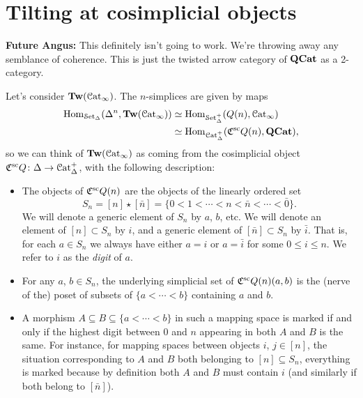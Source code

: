 \documentclass[main.tex]{subfiles}
\begin{document}
\section{Tilting at cosimplicial objects}
\label{sec:tilting_at_cosimplicial_objects}

\textbf{Future Angus:} This definitely isn't going to work. We're throwing away any semblance of coherence. This is just the twisted arrow category of $\mathbf{QCat}$ as a 2-category.

Let's consider $\mathbf{Tw}(\mathcal{C}\mathrm{at}_{\infty})$. The $n$-simplices are given by maps
\begin{align*}
  \mathrm{Hom}_{\mathcal{S}\mathrm{et}_{\Delta}}(\Delta^{n}, \mathbf{Tw}(\mathcal{C}\mathrm{at}_{\infty})) &\simeq \mathrm{Hom}_{\mathcal{S}\mathrm{et}_{\Delta}^{+}}(Q(n), \mathcal{C}\mathrm{at}_{\infty}) \\
  &\simeq \mathrm{Hom}_{\mathcal{C}\mathrm{at}_{\Delta}^{+}}(\mathfrak{C}^{\mathrm{sc}} Q(n), \mathbf{QCat}),
\end{align*}
so we can think of $\mathbf{Tw}(\mathcal{C}\mathrm{at}_{\infty})$ as coming from the cosimplicial object $\mathfrak{C}^{\mathrm{sc}} Q\colon \Delta \to \mathcal{C}\mathrm{at}_{\Delta}^{+}$, with the following description:
\begin{itemize}
  \item The objects of $\mathfrak{C}^{\mathrm{sc}} Q(n)$ are the objects of the linearly ordered set
    \begin{equation*}
      S_{n} = [n] \star [\bar{n}] = \{0 < 1 < \cdots < n < \bar{n} < \cdots < \bar{0}\}.
    \end{equation*}
    We will denote a generic element of $S_{n}$ by $a$, $b$, etc. We will denote an element of $[n] \subset S_{n}$ by $i$, and a generic element of $[\bar{n}] \subset S_{n}$ by $\bar{i}$. That is, for each $a \in S_{n}$ we always have either $a = i$ or $a = \bar{i}$ for some $0 \leq i \leq n$. We refer to $i$ as the \emph{digit} of $a$.

  \item For any $a$, $b \in S_{n}$, the underlying simplicial set of $\mathfrak{C}^{\mathrm{sc}} Q(n)(a, b)$ is the (nerve of the) poset of subsets of $\{a < \cdots < b\}$ containing $a$ and $b$.

  \item A morphism $A \subseteq B \subseteq \{a < \cdots < b\}$ in such a mapping space is marked if and only if the highest digit between 0 and $n$ appearing in both $A$ and $B$ is the same. For instance, for mapping spaces between objects $i$, $j \in [n]$, the situation corresponding to $A$ and $B$ both belonging to $[n] \subseteq S_{n}$, everything is marked because by definition both $A$ and $B$ must contain $i$ (and similarly if both belong to $[\bar{n}]$).
\end{itemize}
\end{document}
